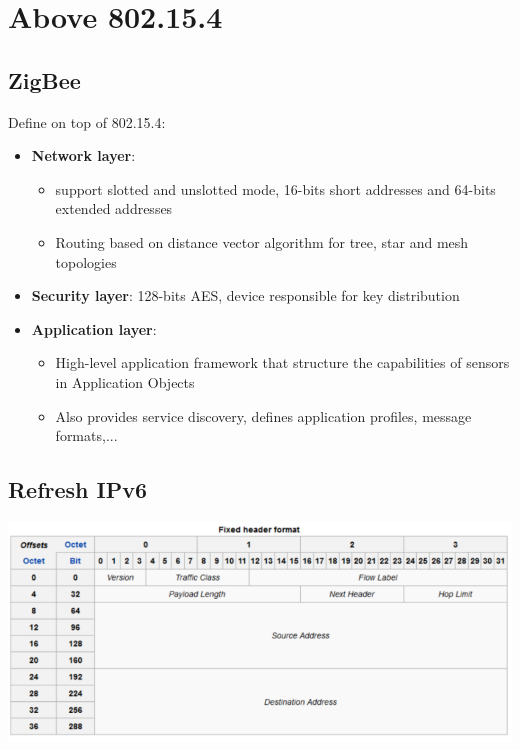 \section{Above 802.15.4}

\subsection{ZigBee}

Define on top of 802.15.4:
\begin{itemize}
    \item \textbf{Network layer}: 
        \begin{itemize}
            \item support slotted and unslotted mode,
                16-bits short addresses and 64-bits extended addresses
            \item Routing based on distance vector algorithm for tree, star
                and mesh topologies
        \end{itemize}
    \item \textbf{Security layer}: 128-bits AES, device responsible for
        key distribution
    \item \textbf{Application layer}: 
        \begin{itemize}
            \item High-level application framework that structure
                the capabilities of sensors in Application Objects
            \item Also provides service discovery, defines application
                profiles, message formats,...
        \end{itemize}
\end{itemize}

\subsection{Refresh IPv6}

\begin{center}
    \includegraphics[width=0.7\linewidth]{img/IPV6.png}
\end{center}

